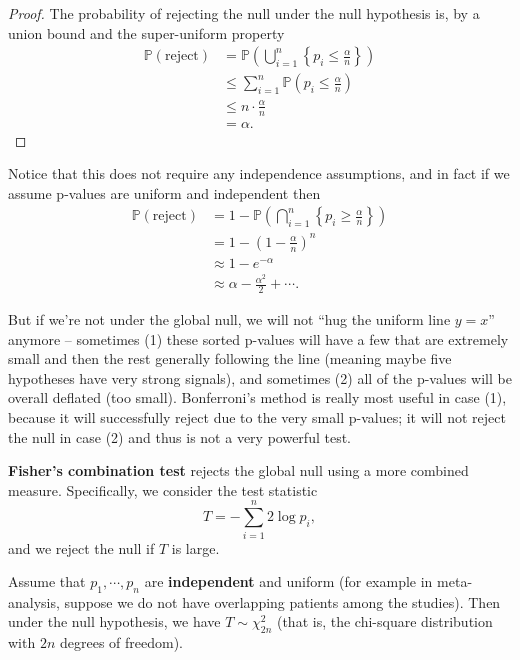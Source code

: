 \begin{proof}
The probability of rejecting the null under the null hypothesis is, by a union bound and the super-uniform property
\begin{align*}
\mathbb{P}(\text{reject}) &= \mathbb{P}\left(\bigcup_{i=1}^{n} \left\{p_i \leq \frac{\alpha}{n}\right\}\right) \\
&\leq \sum_{i=1}^{n} \mathbb{P}\left(p_i \leq \frac{\alpha}{n}\right) \\
&\leq n \cdot \frac{\alpha}{n} \\
&= \alpha.
\end{align*}
\end{proof}
\begin{rem}
    Notice that this does not require any independence assumptions, and in fact if we assume p-values are uniform and independent then 
    \begin{align*}
    \mathbb{P}(\text{reject}) &=1- \mathbb{P}\left(\bigcap_{i=1}^{n} \left\{p_i \geq \frac{\alpha}{n}\right\}\right) \\
    &= 1-\left(1 - \frac{\alpha}{n}\right)^n \\
    &\approx 1- e^{-\alpha} \\
    &\approx \alpha - \frac{\alpha^2}{2} +\cdots.
    \end{align*}
\end{rem}
\begin{rem}
    But if we’re not under the global null, we will not “hug the uniform line $y=x$” anymore – sometimes (1) these sorted p-values will have a few that are extremely small and then the rest generally following the line (meaning maybe five hypotheses have very strong signals), and sometimes (2) all of the p-values will be overall deflated (too small). Bonferroni’s method is really most useful in case (1), because it will successfully reject due to the very small p-values; it will not reject the null in case (2) and thus is not a very powerful test.
\end{rem}
\begin{defn}
\textbf{Fisher's combination test} rejects the global null using a more combined measure. Specifically, we consider the test statistic
\[
T = -\sum_{i=1}^{n} 2 \log p_i,
\]
and we reject the null if $T$ is large.
\end{defn}
\begin{prop}
Assume that $p_1, \cdots, p_n$ are \textbf{independent} and uniform (for example in meta-analysis, suppose we do not have overlapping patients among the studies). Then under the null hypothesis, we have $T \sim \chi^2_{2n}$ (that is, the chi-square distribution with $2n$ degrees of freedom).
\end{prop}
